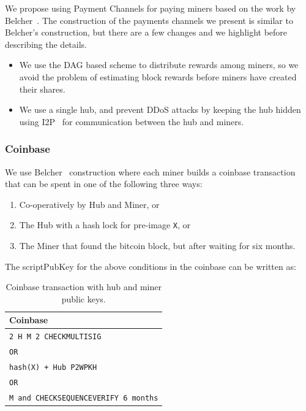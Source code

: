 \documentclass{article}
\begin{document}
We propose using Payment Channels for paying miners based on the work
by Belcher~\cite{channels-for-rewards}. The construction of the
payments channels we present is similar to Belcher's construction, but
there are a few changes and we highlight before describing the
details.

\begin{itemize}
\item We use the DAG based scheme to distribute rewards among miners,
  so we avoid the problem of estimating block rewards before miners
  have created their shares.
\item We use a single hub, and prevent DDoS attacks by keeping the hub
  hidden using I2P~\cite{i2p, i2p-censorship-resistance} for
  communication between the hub and miners.
\end{itemize}



\subsubsection{Coinbase}

We use Belcher~\cite{channels-for-rewards} construction where each
miner builds a coinbase transaction that can be spent in one of the
following three ways:

\begin{enumerate}
\item Co-operatively by Hub and Miner, or
\item The Hub with a hash lock for pre-image \verb|X|, or
\item The Miner that found the bitcoin block, but after waiting
  for six months.
\end{enumerate}

The scriptPubKey for the above conditions in the coinbase can be
written as:

\begin{table}
  \centering
  \begin{tabular}{ l }
    \bfseries Coinbase \\
    \midrule
    \verb|2 H M 2 CHECKMULTISIG| \\
    \verb|OR| \\
    \verb|hash(X) + Hub P2WPKH| \\
    \verb|OR| \\
    \verb|M and CHECKSEQUENCEVERIFY 6 months| \\ 
    \midrule
  \end{tabular}
  \caption{Coinbase transaction with hub and miner public keys.}\label{table:coinbase}
\end{table}
\end{document}
